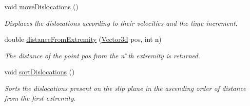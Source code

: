 \begin{DoxyCompactItemize}
void \hyperlink{classSlipPlane_a02482abbb9b9db28a9bb19e6a1c181b5}{move\-Dislocations} ()
\begin{DoxyCompactList}\small\item\em Displaces the dislocations according to their velocities and the time increment. \end{DoxyCompactList}\item 
double \hyperlink{classSlipPlane_a3523030cccb520b5253a811d062f3ddf}{distance\-From\-Extremity} (\hyperlink{classVector3d}{Vector3d} pos, int n)
\begin{DoxyCompactList}\small\item\em The distance of the point pos from the n$^\wedge$th extremity is returned. \end{DoxyCompactList}\item 
void \hyperlink{classSlipPlane_a7fc607c17e5532aed5e93339dc03b18d}{sort\-Dislocations} ()
\begin{DoxyCompactList}\small\item\em Sorts the dislocations present on the slip plane in the ascending order of distance from the first extremity. \end{DoxyCompactList}\end{DoxyCompactItemize}
